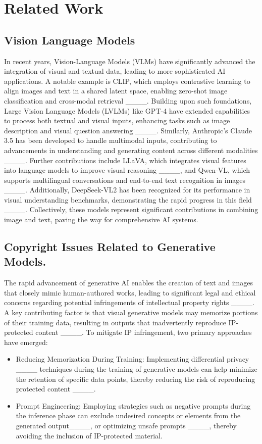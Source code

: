 \section{Related Work}
\subsection{Vision Language Models}
In recent years, Vision-Language Models (VLMs) have significantly advanced the integration of visual and textual data, leading to more sophisticated AI applications. A notable example is CLIP,  which employs contrastive learning to align images and text in a shared latent space, enabling zero-shot image classification and cross-modal retrieval ____. Building upon such foundations, Large Vision Language Models (LVLMs) like GPT-4 have extended capabilities to process both textual and visual inputs, enhancing tasks such as image description and visual question answering ____. Similarly, Anthropic's Claude 3.5 has been developed to handle multimodal inputs, contributing to advancements in understanding and generating content across different modalities ____. Further contributions include LLaVA, which integrates visual features into language models to improve visual reasoning ____, and Qwen-VL, which supports multilingual conversations and end-to-end text recognition in images ____. Additionally, DeepSeek-VL2 has been recognized for its performance in visual understanding benchmarks, demonstrating the rapid progress in this field ____. Collectively, these models represent significant contributions in combining image and text, paving the way for comprehensive AI systems. 

\subsection{Copyright Issues Related to Generative Models.}
The rapid advancement of generative AI enables the creation of text and images that closely mimic human-authored works, leading to significant legal and ethical concerns regarding potential infringements of intellectual property rights ____. A key contributing factor is that visual generative models may memorize portions of their training data, resulting in outputs that inadvertently reproduce IP-protected content ____. To mitigate IP infringement, two primary approaches have emerged:

\begin{itemize}
    \item Reducing Memorization During Training: Implementing differential privacy ____ techniques during the training of generative models can help minimize the retention of specific data points, thereby reducing the risk of reproducing protected content ____.
    \item Prompt Engineering: Employing strategies such as negative prompts during the inference phase can exclude undesired concepts or elements from the generated output____, or optimizing unsafe prompts ____, thereby avoiding the inclusion of IP-protected material.
\end{itemize}

